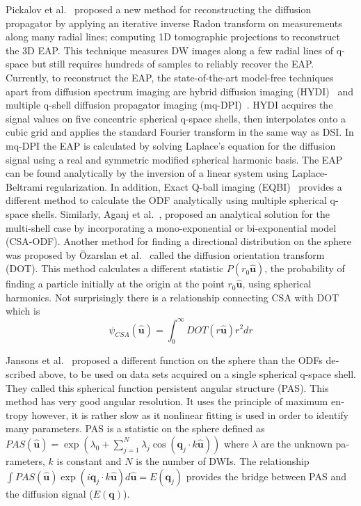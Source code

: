 \documentclass{bioinfo}
\begin{document}
\begin{methods}
Pickalov et al.~\cite{pickalov2006tra} proposed a new method for
reconstructing the diffusion propagator by applying an iterative inverse
Radon transform on measurements along many radial lines; computing
1D tomographic projections to reconstruct the 3D EAP. This technique
measures DW images along a few radial lines of q-space but still requires
hundreds of samples to reliably recover the EAP. Currently, to reconstruct
the EAP, the state-of-the-art model-free techniques apart from diffusion
spectrum imaging are hybrid diffusion imaging (HYDI)~\cite{wu2007hybrid}
and multiple q-shell diffusion propagator imaging (mq-DPI)~\cite{descoteaux2010multiple}.
HYDI acquires the signal values on five concentric spherical q-space
shells, then interpolates onto a cubic grid and applies the standard
Fourier transform in the same way as DSI. In mq-DPI the EAP is calculated
by solving Laplace's equation for the diffusion signal using a real
and symmetric modifi{}ed spherical harmonic basis. The EAP can be
found analytically by the inversion of a linear system using Laplace-Beltrami
regularization. In addition, Exact Q-ball imaging (EQBI)~\cite{canalesrodriguez2009mdq}
provides a different method to calculate the ODF analytically using
multiple spherical q-space shells. Similarly, Aganj et al.~\cite{Aganj2010},
proposed an analytical solution for the multi-shell case by incorporating
a mono-exponential or bi-exponential model (CSA-ODF). Another method
for finding a directional distribution on the sphere was proposed
by Özarslan et al.~\cite{ozarslan2006resolution} called the diffusion
orientation transform (DOT). This method calculates a different statistic
$P(r_{0}\mathbf{\hat{u}})$, the probability of finding a particle
initially at the origin at the point $r_{0}\mathbf{\hat{u}}$, using
spherical harmonics. Not surprisingly there is a relationship connecting
CSA with DOT which is \foreignlanguage{british}{\begin{equation}
\psi_{CSA}(\hat{\mathbf{u}})=\int_{0}^{\infty}DOT(r\hat{\mathbf{u}})r^{2}dr\label{eq:CSAandDOT}\end{equation}
}

%
J\foreignlanguage{english}{ansons et al.~\cite{JansonsPAS2003} proposed
a different function on the sphere than the ODFs described above,
to be used on data sets acquired on a single spherical q-space shell.
They called this spherical function persistent angular structure (PAS).
This method has very good angular resolution. It uses the principle
of maximum entropy however, it is rather slow as it nonlinear fitting
is used in order to identify many parameters. PAS is a statistic on
the sphere defined as $PAS(\hat{\mathbf{u}})=\exp(\lambda_{0}+\sum_{j=1}^{N}\lambda_{j}\cos(\mathbf{q}_{j}\cdot k\hat{\mathbf{u}}))$
where $\lambda$ are the unknown parameters, $k$ is constant and
$N$ is the number of DWIs. The relationship $\int PAS(\hat{\mathbf{u}})\exp(i\mathbf{q}_{j}\cdot k\hat{\mathbf{u}})d\hat{\mathbf{u}}=E(\mathbf{q}_{j})$
provides the bridge between PAS and the diffusion signal ($E(\mathbf{q})$).}


\end{methods}
\end{document}
